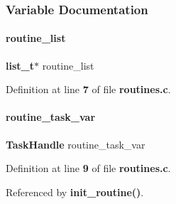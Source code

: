 \subsubsection{Variable Documentation}
\mbox{\label{routines_8c_a4d70ab7b0355718354a9678801101aa2}} 
\paragraph{routine\+\_\+list}
{\footnotesize\ttfamily \textbf{ list\+\_\+t}$\ast$ routine\+\_\+list\hspace{0.3cm}{\ttfamily [static]}}



Definition at line \textbf{ 7} of file \textbf{ routines.\+c}.

\mbox{\label{routines_8c_a8ac8c8354c257b390c000a5153f4fec6}} 
\paragraph{routine\+\_\+task\+\_\+var}
{\footnotesize\ttfamily \textbf{ Task\+Handle} routine\+\_\+task\+\_\+var\hspace{0.3cm}{\ttfamily [static]}}



Definition at line \textbf{ 9} of file \textbf{ routines.\+c}.



Referenced by \textbf{ init\+\_\+routine()}.

